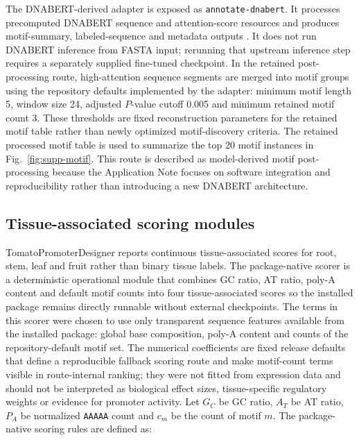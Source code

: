 \documentclass[10pt]{article}
\begin{document}
The DNABERT-derived adapter is exposed as \texttt{annotate-dnabert}. It processes precomputed DNABERT sequence and attention-score resources and produces motif-summary, labeled-sequence and metadata outputs \cite{Ji2021}. It does not run DNABERT inference from FASTA input; rerunning that upstream inference step requires a separately supplied fine-tuned checkpoint. In the retained post-processing route, high-attention sequence segments are merged into motif groups using the repository defaults implemented by the adapter: minimum motif length 5, window size 24, adjusted \(P\)-value cutoff 0.005 and minimum retained motif count 3. These thresholds are fixed reconstruction parameters for the retained motif table rather than newly optimized motif-discovery criteria. The retained processed motif table is used to summarize the top 20 motif instances in Fig.~\ref{fig:supp-motif}. This route is described as model-derived motif post-processing because the Application Note focuses on software integration and reproducibility rather than introducing a new DNABERT architecture.

\subsection{Tissue-associated scoring modules}

TomatoPromoterDesigner reports continuous tissue-associated scores for root, stem, leaf and fruit rather than binary tissue labels. The package-native scorer is a deterministic operational module that combines GC ratio, AT ratio, poly-A content and default motif counts into four tissue-associated scores so the installed package remains directly runnable without external checkpoints. The terms in this scorer were chosen to use only transparent sequence features available from the installed package: global base composition, poly-A content and counts of the repository-default motif set. The numerical coefficients are fixed release defaults that define a reproducible fallback scoring route and make motif-count terms visible in route-internal ranking; they were not fitted from expression data and should not be interpreted as biological effect sizes, tissue-specific regulatory weights or evidence for promoter activity. Let \(G_C\) be GC ratio, \(A_T\) be AT ratio, \(P_A\) be normalized \texttt{AAAAA} count and \(c_m\) be the count of motif \(m\). The package-native scoring rules are defined as:
\end{document}
